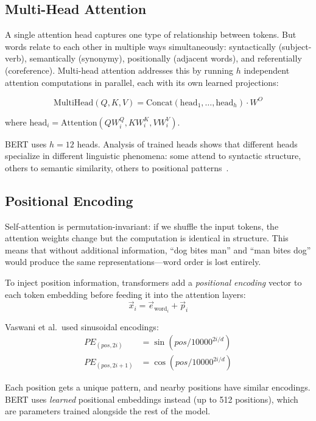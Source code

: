 \documentclass[11pt,a4paper]{article}
\theoremstyle{definition}
\theoremstyle{plain}
\begin{document}
\subsection{Multi-Head Attention}

A single attention head captures one type of relationship between tokens. But words relate to each other in multiple ways simultaneously: syntactically (subject-verb), semantically (synonymy), positionally (adjacent words), and referentially (coreference). Multi-head attention addresses this by running $h$ independent attention computations in parallel, each with its own learned projections:

\begin{equation}
\text{MultiHead}(Q, K, V) = \text{Concat}(\text{head}_1, \ldots, \text{head}_h) \cdot W^O
\end{equation}

where $\text{head}_i = \text{Attention}(Q W_i^Q, K W_i^K, V W_i^V)$.

BERT uses $h = 12$ heads. Analysis of trained heads shows that different heads specialize in different linguistic phenomena: some attend to syntactic structure, others to semantic similarity, others to positional patterns~\cite{clark2019what}.

\subsection{Positional Encoding}

Self-attention is permutation-invariant: if we shuffle the input tokens, the attention weights change but the computation is identical in structure. This means that without additional information, ``dog bites man'' and ``man bites dog'' would produce the same representations---word order is lost entirely.

To inject position information, transformers add a \emph{positional encoding} vector to each token embedding before feeding it into the attention layers:
\begin{equation}
\vec{x}_i = \vec{e}_{\text{word}_i} + \vec{p}_i
\end{equation}

Vaswani et al.\ used sinusoidal encodings:
\begin{align}
PE_{(pos, 2i)} &= \sin(pos / 10000^{2i/d}) \\
PE_{(pos, 2i+1)} &= \cos(pos / 10000^{2i/d})
\end{align}

Each position gets a unique pattern, and nearby positions have similar encodings. BERT uses \emph{learned} positional embeddings instead (up to 512 positions), which are parameters trained alongside the rest of the model.
\end{document}
